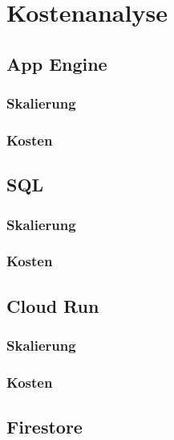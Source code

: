 \chapter{Kostenanalyse}
\label{cha:kostenanalyse}



\section{App Engine}
\blindtext

\subsection{Skalierung}
\blindtext

\subsection{Kosten}
\sblindtext


\section{SQL}
\blindtext

\subsection{Skalierung}
\blindtext

\subsection{Kosten}
\sblindtext


\section{Cloud Run}
\blindtext

\subsection{Skalierung}
\blindtext

\subsection{Kosten}
\sblindtext


\section{Firestore}
\blindtext

